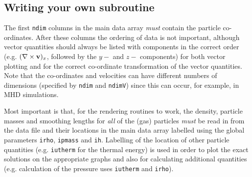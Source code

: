 \documentclass[a4paper,12pt]{article}
\begin{document}
\subsection{Writing your own subroutine}
The first \verb+ndim+ columns in the main data array \emph{must} contain the particle co-ordinates.
After these columns the ordering of data is not important, although vector quantities should
always be listed with components in the correct order (e.g. $(\nabla\times {\bf v})_x$,
followed by the $y-$ and $z-$ components) for both vector plotting and for the
correct co-ordinate transformation of the vector quantities. Note that the co-ordinates and velocities can have different
numbers of dimensions (specified by \verb+ndim+ and \verb+ndimV+) since this can occur, for example, in MHD simulations.

Most important is that, for the rendering routines to work, the density, particle
masses and smoothing lengths for \emph{all} of the (gas) particles \emph{must} be read in from
the data file and their locations in the main data array labelled using the global
parameters \verb+irho+, \verb+ipmass+ and \verb+ih+. Labelling of the location of other particle
quantities (e.g. \verb+iutherm+ for the thermal energy) is used in
order to plot the exact solutions on the appropriate graphs and also for calculating
additional quantities (e.g. calculation of the pressure uses \verb+iutherm+ and
\verb+irho+).
\end{document}
